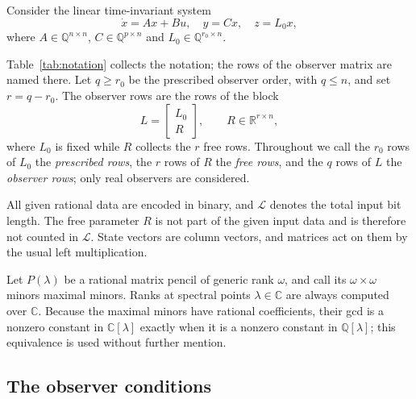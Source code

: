 \documentclass[journal]{IEEEtran}
\theoremstyle{plainn}
\theoremstyle{remark}
\begin{document}
Consider the linear time-invariant system
\begin{equation*}
\dot{x}=Ax+Bu,\quad y=Cx,\quad z=L_0x,
\end{equation*}
where $A\in\mathbb Q^{n\times n}$, $C\in\mathbb Q^{p\times n}$ and
$L_0\in\mathbb Q^{r_0\times n}$.

Table~\ref{tab:notation} collects the notation; the rows of the observer matrix are named there.
Let $q\ge r_0$ be the prescribed observer order, with $q\le n$, and set $r=q-r_0$. The
observer rows are the rows of the block
\begin{equation*}
L=\begin{bmatrix}L_0\\R\end{bmatrix},\qquad R\in\mathbb R^{r\times n},
\end{equation*}
where $L_0$ is fixed while $R$ collects the $r$ free rows. Throughout we call the $r_0$ rows of
$L_0$ the \emph{prescribed rows}, the $r$ rows of $R$ the \emph{free rows}, and the $q$ rows of $L$
the \emph{observer rows}; only real observers are considered.

All given rational data are encoded in binary, and $\mathcal L$ denotes the total input
bit length. The free parameter $R$ is not part of the given input data and is therefore
not counted in $\mathcal L$. State vectors are column vectors, and matrices act on them by
the usual left multiplication.

Let $P(\lambda)$ be a rational matrix pencil of generic rank $\omega$, and call its
$\omega\times\omega$ minors maximal minors. Ranks at spectral points $\lambda\in\mathbb C$
are always computed over $\mathbb C$. Because the maximal minors have rational
coefficients, their gcd is a nonzero constant in $\mathbb C[\lambda]$ exactly when it is a
nonzero constant in $\mathbb Q[\lambda]$; this equivalence is used without further
mention.

\subsection{The observer conditions}\label{sec:conditions}
\end{document}
